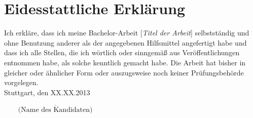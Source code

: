 \documentclass[12pt]{article}
\begin{document}
\newpage
\section*{Eidesstattliche Erklärung}
Ich erkläre, dass ich meine Bachelor-Arbeit [\emph{Titel der Arbeit}] selbstständig und ohne Benutzung anderer als der angegebenen Hilfsmittel angefertigt habe und dass ich alle Stellen, die ich wörtlich oder sinngemäß aus Veröffentlichungen entnommen habe, als solche kenntlich gemacht habe. Die Arbeit hat bisher in gleicher oder ähnlicher Form oder auszugsweise noch keiner Prüfungsbehörde vorgelegen. \\
\noindent Stuttgart, den XX.XX.2013
\begin{flushright}
$\overline{~~~~~~~~~\mbox{(Name des Kandidaten)}~~~~~~~~~}$
\end{flushright}
\end{document}

